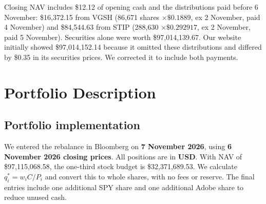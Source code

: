\documentclass[10pt,a4paper]{article}
\begin{document}
Closing NAV includes \$12.12 of opening cash and the distributions paid before 6 November: \$16,372.15 from VGSH (86,671 shares $\times\$0.1889$, ex 2 November, paid 4 November) and \$84,544.63 from STIP (288,630 $\times\$0.292917$, ex 2 November, paid 5 November). Securities alone were worth \$97,014,139.67. Our website initially showed \$97,014,152.14 because it omitted these distributions and differed by \$0.35 in its securities prices. We corrected it to include both payments.

\clearpage
\section{Portfolio Description}
\label{sec:implementation}
\subsection{Portfolio implementation}
We entered the rebalance in Bloomberg on \textbf{7 November 2026}, using \textbf{6 November 2026 closing prices}. All positions are in \textbf{USD}. With NAV of \$97,115,068.58, the one-third stock budget is \$32,371,689.53. We calculate $q_i^*=w_iC/P_i$ and convert this to whole shares, with no fees or reserve. The final entries include one additional SPY share and one additional Adobe share to reduce unused cash.
\end{document}
